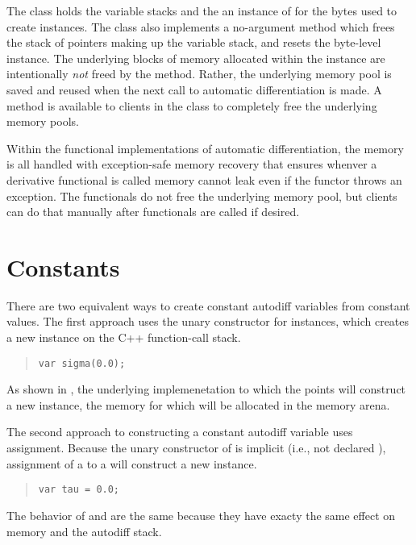 \documentclass[10pt]{article}
\begin{document}
The  class holds the variable stacks and
the an instance of  for the bytes used to
create  instances.  The 
class also implements a no-argument  method
which frees the stack of pointers making up the variable stack, and
resets the byte-level  instance.  The underlying
blocks of memory allocated within the  instance are
intentionally \emph{not} freed by the  method.
Rather, the underlying memory pool is saved and reused when the next
call to automatic differentiation is made.  A method is available to
clients in the  class to completely free the
underlying memory pools.

Within the functional implementations of automatic differentiation,
the memory is all handled with exception-safe memory recovery that
ensures whenver a derivative functional is called memory cannot leak
even if the functor throws an exception.  The functionals do not free
the underlying memory pool, but clients can do that manually after
functionals are called if desired.




\section{Constants}

There are two equivalent ways to create constant autodiff variables
from constant  values.  The first approach uses the unary
constructor for  instances, which creates a new 
instance  on the C++ function-call stack.
%
\begin{quote}
\begin{Verbatim}
var sigma(0.0);
\end{Verbatim}
\end{quote}
%
As shown in , the underlying
 implemenetation to which the  points will
construct a new instance, the memory for which will be allocated in
the memory arena.

The second approach to constructing a constant autodiff variable uses
assignment.  Because the unary constructor of  is implicit
(i.e., not declared ), assignment of a  to
a  will construct a new  instance.  
%
\begin{quote}
\begin{Verbatim}
var tau = 0.0;
\end{Verbatim}
\end{quote}
%
The behavior of  and  are the same because they
have exacty the same effect on memory and the autodiff stack.
\end{document}
